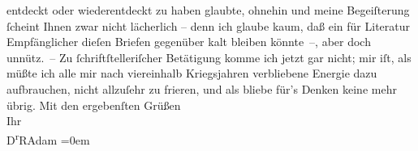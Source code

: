 \begin{ledgroupsized}[t]{13cm}
               entdeckt oder wiederentdeckt zu haben glaubte, ohnehin und meine Begeiſterung ſcheint
               Ihnen zwar nicht lächerlich – denn ich glaube kaum, daß ein für Literatur
               Empfänglicher dieſen Briefen gegenüber kalt bleiben könnte –, aber doch unnütz. –\pend
           \pstart
           Zu ſchriftſtelleriſcher Betätigung komme ich jetzt gar nicht; mir iſt, als müßte ich
               alle mir nach viereinhalb Kriegsjahren verbliebene Energie dazu aufbrauchen, nicht
               allzuſehr zu frieren, und als bliebe für’s Denken keine mehr übrig.\pend
           \pstart
           Mit den ergebenſten Grüßen{\\[\baselineskip]}Ihr{\\[\baselineskip]}\spacefill\mbox{D\textsuperscript{r}RAdam}\pend
           \leftskip=0em{}
         
         \endnumbering{}\end{ledgroupsized}  \newcommand{\dateiname}{L02314}\newcommand{\titel}{Robert Adam an Arthur Schnitzler, 2. 12. 1918}\newcommand{\editorInnen}{Martin Anton Müller und Gerd-Hermann Susen}
      